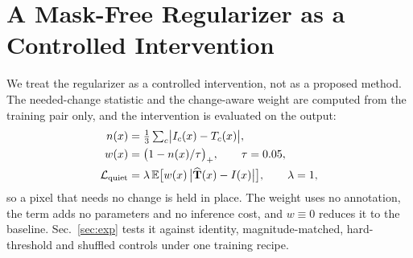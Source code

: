 \section{A Mask-Free Regularizer as a Controlled Intervention}
\label{sec:method}

We treat the regularizer as a controlled intervention, not as a proposed method.
The needed-change statistic and the change-aware weight are computed from the
training pair only, and the intervention is evaluated on the output:
\begin{equation}
\begin{aligned}
n(x) &= \tfrac{1}{3}\textstyle\sum_{c}\bigl|I_c(x)-T_c(x)\bigr|, \\
w(x) &= \bigl(1-n(x)/\tau\bigr)_{+},\qquad \tau=0.05, \\
\mathcal{L}_{\mathrm{quiet}} &= \lambda\,\mathbb{E}\bigl[w(x)\,\bigl|\widehat{\mathbf{T}}(x)-I(x)\bigr|\bigr],\qquad \lambda=1,
\end{aligned}
\label{eq:quiet}
\end{equation}
so a pixel that needs no change is held in place. The weight uses no annotation,
the term adds no parameters and no inference cost, and $w\equiv0$ reduces it to the
baseline. Sec.~\ref{sec:exp} tests it against identity, magnitude-matched,
hard-threshold and shuffled controls under one training recipe.

